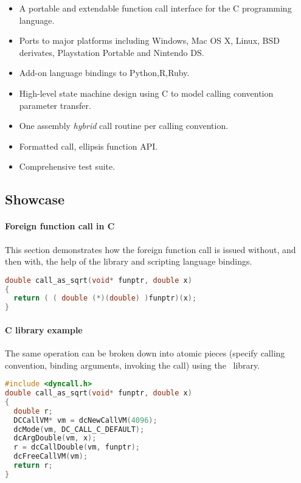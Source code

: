 \begin{itemize}
\item A portable and extendable function call interface for the C programming 
language.
\item Ports to major platforms including Windows, Mac OS X, Linux, BSD derivates, Playstation Portable and Nintendo DS.
\item Add-on language bindings to Python,R,Ruby.
\item High-level state machine design using C to model calling convention
parameter transfer.
\item One assembly \emph{hybrid} call routine per calling convention.
\item Formatted call, ellipsis function API.
\item Comprehensive test suite.
\end{itemize}

\pagebreak

\subsection{Showcase}

\paragraph{Foreign function call in C}
This section demonstrates how the foreign function call is issued without, and then 
with, the help of the  library and scripting language
bindings.

\begin{lstlisting}[language=c,caption=Foreign function call in C]
double call_as_sqrt(void* funptr, double x)
{
  return ( ( double (*)(double) )funptr)(x);
}
\end{lstlisting}

\paragraph{ C library example}

The same operation can be broken down into atomic pieces 
(specify calling convention, binding arguments, invoking the call)
using the \dc\ library.

\begin{lstlisting}[language=c,caption=Dyncall C library example]
#include <dyncall.h>
double call_as_sqrt(void* funptr, double x)
{
  double r;
  DCCallVM* vm = dcNewCallVM(4096);
  dcMode(vm, DC_CALL_C_DEFAULT);
  dcArgDouble(vm, x);  
  r = dcCallDouble(vm, funptr);
  dcFreeCallVM(vm);
  return r;
}
\end{lstlisting}

